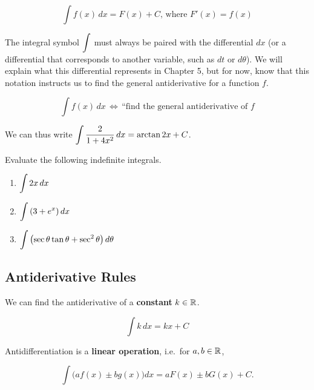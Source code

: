 \documentclass[12pt]{article}
\begin{document}
$$\int f(x)\,dx=F(x)+C\text{, where } F'(x)=f(x)$$

\vspace{3mm}

The integral symbol $\displaystyle\int$ must always be paired with the differential $dx$ (or a differential that corresponds to another variable, such as $dt$ or $d\theta$). We will explain what this differential represents in Chapter 5, but for now, know that this notation instructs us to find the general antiderivative for a function $f$.

\vspace{3mm}

$$\int f(x)\,dx \,\Longleftrightarrow\, \text{``find the general antiderivative of }f$$

\vspace{3mm}

We can thus write $\displaystyle\int \frac{2}{1+4x^2}\,dx=\arctan 2x+C$.

\vspace{3mm}

\Example Evaluate the following indefinite integrals.

\begin{enumerate}
\item[\tc{1}] $\displaystyle\int 2x\,dx$

\vspace{20mm}

\item[\tc{2}] $\displaystyle\int\left( 3+e^x\right) dx$

\vspace{20mm}

\item[\tc{3}] $\displaystyle\int \left( \sec\theta \tan \theta + \sec^2\theta\right) d\theta$
\end{enumerate}

\newpage

\subsection*{Antiderivative Rules}

We can find the antiderivative of a \textbf{constant} $k\in\mathbb{R}$.

$$\int k\,dx=kx+C$$

\vspace{5mm}

Antidifferentiation is a \textbf{linear operation}, i.e.\ for $a,b\in\mathbb{R}$,

$$\int \big( af(x)\pm bg(x)\big) dx = aF(x)\pm bG(x)+C.$$
\end{document}
